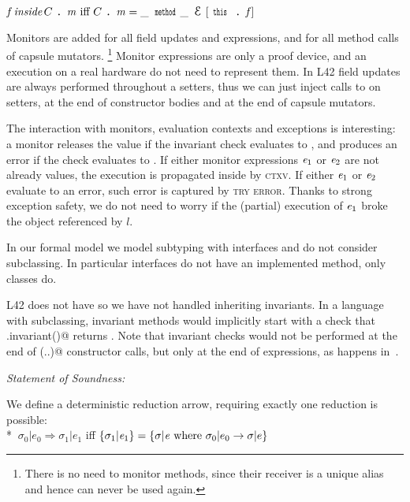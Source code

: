 $%
\f\, \textit{inside}\, C\singleDot\m\text{ iff }
C\singleDot\m=\_\,\Kw{method}\_\,\ctx[\Kw{this}\singleDot\f]
$


\noindent Monitors are added for all field updates and \Q@new@ expressions, and for all
method calls of capsule mutators.%
\footnote{%
There is no need to monitor \Q@capsule@ methods, since their receiver is a unique alias and hence can never be used again.
}
Monitor expressions are only a proof device, and an execution on a real hardware do not need to represent them. 
In L42 field updates are always performed throughout a setters,
thus we can just inject
calls to \Q@invariant@ on setters, at the end of constructor bodies and at the end of  capsule mutators.

The interaction with monitors, evaluation contexts and exceptions is interesting:
a monitor releases the value if the invariant check evaluates to \Q@true@, and produces an error if the 
check evaluates to \Q@false@.
If either monitor expressions ${\mathit{e}}_1$ or ${\mathit{e}}_2$ are not already values, the execution is propagated inside
by \textsc{ctxv}.
If either ${\mathit{e}}_1$ or ${\mathit{e}}_2$ evaluate to an error, such error is captured by 
\textsc{try error}.
Thanks to strong exception safety,
we do not need to worry
if the (partial) execution of ${\mathit{e}}_1$ broke the object referenced by $l$.




\noindent In our formal model we model subtyping with interfaces 
and do not consider subclassing.
In particular interfaces do not have an implemented \Q@invariant@ method, only classes do.

L42 does not have \Q@extends@ so we have not handled inheriting invariants.
In a language with subclassing, invariant methods would implicitly start with a check that \Q@super.invariant()@ returns \Q@true@.
Note that invariant checks would not be performed at the end of \Q@super(..)@ constructor calls, but only at the end of \Q@new@ expressions, as happens in~\cite{feldman2006jose}.



\loseSpace
\noindent\textit{Statement of Soundness:}

\noindent We define
a deterministic reduction arrow, requiring exactly one reduction is possible:\\*
\indent$\ \sigma_0|e_0\Rightarrow \sigma_1|e_1$ iff $\{\sigma_1|{\mathit{e}}_1\}=\{\sigma|{\mathit{e}} \text{ where } \sigma_0|e_0\rightarrow \sigma|e\}$

